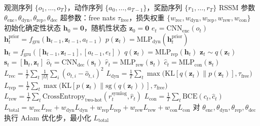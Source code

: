 \documentclass[12pt,a4paper]{ctexart}
\begin{document}
\begin{algorithm}[H]
\caption{RSSM 前向传播与损失计算（单批次）}
\label{alg:rssm_training}
\begin{algorithmic}[1]
\Require 观测序列 $\{o_1, \ldots, o_T\}$，动作序列 $\{a_0, \ldots, a_{T-1}\}$，奖励序列 $\{r_1, \ldots, r_T\}$
\Require RSSM 参数 $\theta_{\text{enc}}, \theta_{\text{dyn}}, \theta_{\text{rep}}, \theta_{\text{dec}}$
\Require 超参数：free nats $\tau_{\text{free}}$，损失权重 $\{w_{\text{rec}}, w_{\text{dyn}}, w_{\text{rep}}, w_{\text{rew}}, w_{\text{con}}\}$
\State 初始化确定性状态 $\mathbf{h}_0 = \mathbf{0}$，随机性状态 $\mathbf{z}_0 = \mathbf{0}$
    \State $e_t = \text{CNN}_{\text{enc}}(o_t)$ 
    \State $\mathbf{h}_t^{\text{prior}} = f_{\text{gru}}(\mathbf{h}_{t-1}, \mathbf{z}_{t-1}, a_{t-1})$ 
    \State $p(\mathbf{z}_t) = \text{MLP}_{\text{dyn}}(\mathbf{h}_t^{\text{prior}})$ 
    \State $\mathbf{h}_t = f_{\text{gru}}([\mathbf{h}_{t-1}, \mathbf{z}_{t-1}], [a_{t-1}, e_t])$ 
    \State $q(\mathbf{z}_t) = \text{MLP}_{\text{rep}}(\mathbf{h}_t)$ 
    \State $\mathbf{z}_t \sim q(\mathbf{z}_t)$ 
    \State $\mathbf{s}_t = [\mathbf{h}_t, \mathbf{z}_t]$ 
    \State $\hat{o}_t = \text{CNN}_{\text{dec}}(\mathbf{s}_t)$ 
    \State $\hat{r}_t = \text{MLP}_{\text{rew}}(\mathbf{s}_t)$ 
    \State $\hat{c}_t = \text{MLP}_{\text{con}}(\mathbf{s}_t)$ 
\EndFor
\State $L_{\text{rec}} = \frac{1}{T} \sum_t \frac{1}{|\Omega|} \sum_i (o_{t,i} - \hat{o}_{t,i})^2$
\State $L_{\text{dyn}} = \frac{1}{T} \sum_t \max\big(\text{KL}[q(\mathbf{z}_t) \| p(\mathbf{z}_t)], \tau_{\text{free}}\big)$
\State $L_{\text{rep}} = \frac{1}{T} \sum_t \max\big(\text{KL}[p(\mathbf{z}_t) \| \text{sg}(q(\mathbf{z}_t))], \tau_{\text{free}}\big)$
\State $L_{\text{rew}} = \frac{1}{T} \sum_t \text{CrossEntropy}_{\text{two-hot}}(r_t^{\text{symlog}}, \hat{r}_t)$
\State $L_{\text{con}} = \frac{1}{T} \sum_t \text{BCE}(c_t, \hat{c}_t)$
\State $L_{\text{total}} = w_{\text{rec}}L_{\text{rec}} + w_{\text{dyn}}L_{\text{dyn}} + w_{\text{rep}}L_{\text{rep}} + w_{\text{rew}}L_{\text{rew}} + w_{\text{con}}L_{\text{con}}$
\State 对 $\theta_{\text{enc}}, \theta_{\text{dyn}}, \theta_{\text{rep}}, \theta_{\text{dec}}$ 执行 Adam 优化步，最小化 $L_{\text{total}}$
\end{algorithmic}
\end{algorithm}
\end{document}
